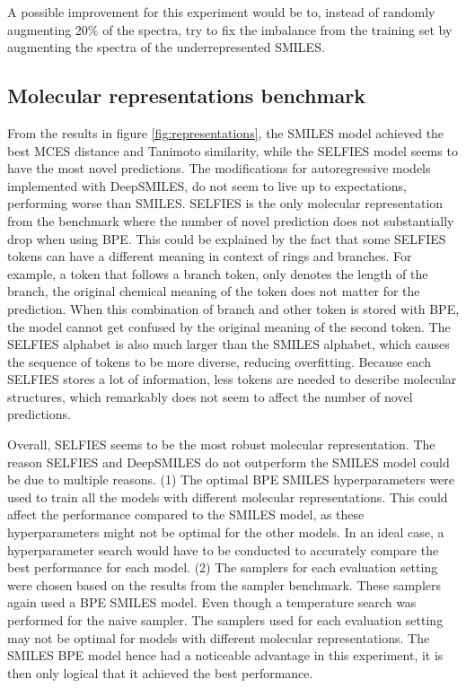 A possible improvement for this experiment would be to, instead of randomly augmenting 20\% of the spectra, try to fix the imbalance from the training set by augmenting the spectra of the underrepresented SMILES.

\subsection{Molecular representations benchmark}

From the results in figure \ref{fig:representations}, the SMILES model achieved the best MCES distance and Tanimoto similarity, while the SELFIES model seems to have the most novel predictions.
The modifications for autoregressive models implemented with DeepSMILES, do not seem to live up to expectations, performing worse than SMILES.
SELFIES is the only molecular representation from the benchmark where the number of novel prediction does not substantially drop when using \ac{BPE}.
This could be explained by the fact that some SELFIES tokens can have a different meaning in context of rings and branches. 
For example, a token that follows a branch token, only denotes the length of the branch, the original chemical meaning of the token does not matter for the prediction.
When this combination of branch and other token is stored with \ac{BPE}, the model cannot get confused by the original meaning of the second token.
The SELFIES alphabet is also much larger than the SMILES alphabet, which causes the sequence of tokens to be more diverse, reducing overfitting.
Because each SELFIES stores a lot of information, less tokens are needed to describe molecular structures, which remarkably does not seem to affect the number of novel predictions.

Overall, SELFIES seems to be the most robust molecular representation.
The reason SELFIES and DeepSMILES do not outperform the SMILES model could be due to multiple reasons.
(1) The optimal \ac{BPE} SMILES hyperparameters were used to train all the models with different molecular representations.
This could affect the performance compared to the SMILES model, as these hyperparameters might not be optimal for the other models.
In an ideal case, a hyperparameter search would have to be conducted to accurately compare the best performance for each model.
(2) The samplers for each evaluation setting were chosen based on the results from the sampler benchmark.
These samplers again used a \ac{BPE} SMILES model. Even though a temperature search was performed for the naive sampler.
The samplers used for each evaluation setting may not be optimal for models with different molecular representations.
The SMILES \ac{BPE} model hence had a noticeable advantage in this experiment, it is then only logical that it achieved the best performance.

